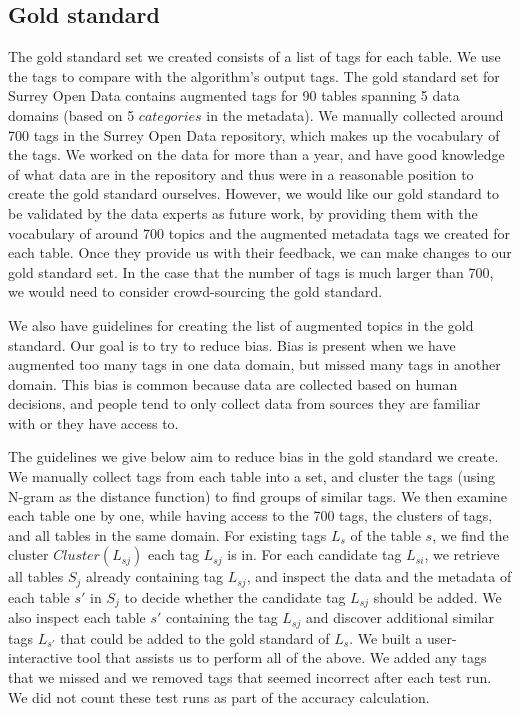 \subsection{Gold standard}
\label{ssec:GoldStandard}

The gold standard set we created consists of a list of tags for each table. We use the tags to compare with the algorithm's output tags. The gold standard set for Surrey Open Data contains augmented tags for 90 tables spanning 5 data domains (based on 5 $categories$ in the metadata). We manually collected around 700 tags in the Surrey Open Data repository, which makes up the vocabulary of the tags. %
We worked on the data for more than a year, and have good knowledge of what data are in the repository and thus were in a reasonable position to create the gold standard ourselves.
However, we would like our gold standard to be validated by the data experts as future work, by providing them with the vocabulary of around 700 topics and the augmented metadata tags we created for each table. Once they provide us with their feedback, we can make changes to our gold standard set. In the case that the number of tags is much larger than 700, we would need to consider crowd-sourcing the gold standard.

We also have guidelines for creating the list of augmented topics in the gold standard. Our goal is to try to reduce bias. Bias is present when we have augmented too many tags in one data domain, but missed many tags in another domain. This bias is common because data are collected based on human decisions, and people tend to only collect data from sources they are familiar with or they have access to.

The guidelines we give below aim to reduce bias in the gold standard we create. We manually collect tags from each table into a set, and cluster the tags (using N-gram as the distance function) to find groups of similar tags. We then examine each table one by one, while having access to the 700 tags, the clusters of tags, and all tables in the same domain. For existing tags $L_{s}$ of the table $s$, we find the cluster $\textit{Cluster}(L_{sj})$ each tag $L_{sj}$ is in. For each candidate tag $L_{si}$, we retrieve all tables $S_{j}$ already containing tag $L_{sj}$, and inspect the data and the metadata of each table $s'$ in $S_{j}$ to decide whether the candidate tag $L_{sj}$ should be added. We also inspect each table $s'$ containing the tag $L_{sj}$ and discover additional similar tags $L_{s'}$ that could be added to the gold standard of $L_{s}$. We built a user-interactive tool that assists us to perform all of the above. %
We added any tags that we missed and we removed tags that seemed incorrect after each test run. We did not count these test runs as part of the accuracy calculation.

